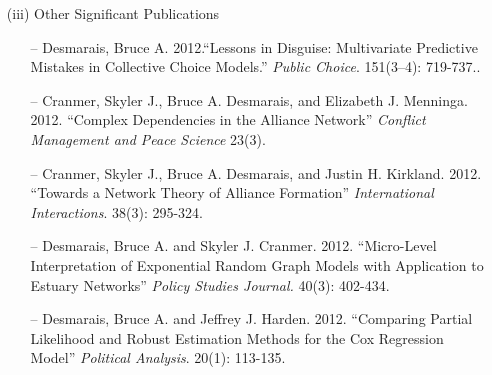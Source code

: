 \begin{enumerate}
\begin{enumerate}
\item[(iii)] Other Significant Publications
\begin{enumerate}
\item[--] Desmarais, Bruce A. 2012.``Lessons in Disguise: Multivariate Predictive Mistakes in Collective Choice Models.'' \emph{Public Choice}.  151(3--4): 719-737..
\item[--] Cranmer, Skyler J., Bruce A. Desmarais, and Elizabeth J. Menninga. 2012.  ``Complex Dependencies in the Alliance Network'' \emph{Conflict Management and  Peace Science} 23(3).
\item[--] Cranmer, Skyler J., Bruce A. Desmarais, and Justin H. Kirkland. 2012. ``Towards a Network Theory of Alliance Formation'' \emph{International Interactions}. 38(3): 295-324.
\item[--] Desmarais, Bruce A. and Skyler J. Cranmer. 2012. ``Micro-Level Interpretation of Exponential  Random Graph Models with Application to Estuary Networks'' \emph{Policy Studies Journal.} 40(3): 402-434.
\item[--] Desmarais, Bruce A. and Jeffrey J. Harden. 2012. ``Comparing Partial Likelihood and Robust Estimation Methods for the Cox Regression Model'' \emph{Political Analysis}. 20(1): 113-135.
\end{enumerate}
\end{enumerate}


\end{enumerate}
